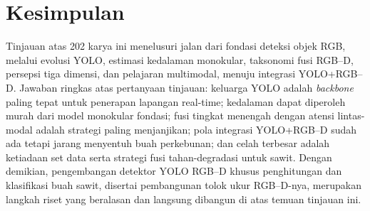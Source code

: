 \section{Kesimpulan}\label{sec:kesimpulan}
Tinjauan atas 202 karya ini menelusuri jalan dari fondasi deteksi objek
RGB, melalui evolusi YOLO, estimasi kedalaman monokular, taksonomi fusi
RGB--D, persepsi tiga dimensi, dan pelajaran multimodal, menuju
integrasi YOLO+RGB--D. Jawaban ringkas atas pertanyaan tinjauan: keluarga
YOLO adalah \textit{backbone} paling tepat untuk penerapan lapangan
real-time; kedalaman dapat diperoleh murah dari model monokular fondasi;
fusi tingkat menengah dengan atensi lintas-modal adalah strategi paling
menjanjikan; pola integrasi YOLO+RGB--D sudah ada tetapi jarang menyentuh
buah perkebunan; dan celah terbesar adalah ketiadaan set data serta
strategi fusi tahan-degradasi untuk sawit. Dengan demikian, pengembangan
detektor YOLO RGB--D khusus penghitungan dan klasifikasi buah sawit,
disertai pembangunan tolok ukur RGB--D-nya, merupakan langkah riset yang
beralasan dan langsung dibangun di atas temuan tinjauan ini.
